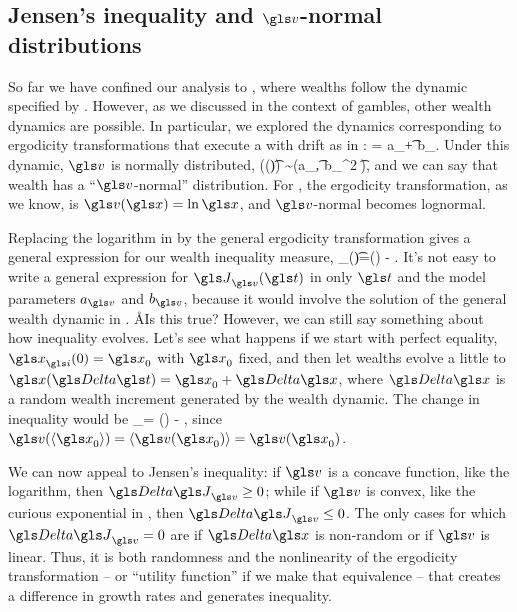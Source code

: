 
\subsection{Jensen's inequality and $\gv$-normal distributions}
So far we have confined our analysis to \GBM, where wealths follow the dynamic specified by . However, as we discussed in the context of gambles, other wealth dynamics are possible. In particular, we explored the dynamics corresponding to ergodicity transformations that execute a \BM with drift as in :
\be
\gd\gv = a_\gv \gd\t + b_\gv \gd\gW.
\ee
Under this dynamic, $\gv$ is normally distributed,
\be
\gv(\x(\t)) \sim \mathcal{\N}\left(a_\gv\t, {b_\gv}^2 \t\right),
\ee
and we can say that wealth has a ``$\gv$-normal'' distribution. For \GBM, the ergodicity transformation, as we know, is $\gv(\x)=\ln \x$, and $\gv$-normal becomes lognormal.

Replacing the logarithm in  by the general ergodicity transformation gives a general expression for our wealth inequality measure,
\be
\J_\gv(\t)=\gv(\ave{\x(\t)}) - \ave{\gv(\x(\t))}.
\ee
It's not easy to write a general expression for $\J_\gv(\t)$ in only $\t$ and the model parameters $a_\gv$ and $b_\gv$, because it would involve the solution of the general wealth dynamic in . \AA{Is this true?} However, we can still say something about how inequality evolves. Let's see what happens if we start with perfect equality, $\x_\gi(0)=\x_0$ with $\x_0$ fixed, and then let wealths evolve a little to $\x(\D \t)=\x_0+\D \x$, where $\D \x$ is a random wealth increment generated by the wealth dynamic. The change in inequality would be
\be
\D \J_\gv = \gv() - ,
\ee
since $\gv(\ave{\x_0})=\ave{\gv(\x_0)}=\gv(\x_0)$.

We can now appeal to Jensen's inequality: if $\gv$ is a concave function, like the logarithm, then $\D \J_\gv \geq 0$; while if $\gv$ is convex, like the curious exponential in , then $\D \J_\gv \leq 0$. The only cases for which $\D \J_\gv=0$ are if $\D \x$ is non-random or if $\gv$ is linear. Thus, it is both randomness and the nonlinearity of the ergodicity transformation -- or ``utility function'' if we make that equivalence -- that creates a difference in growth rates and generates inequality.


